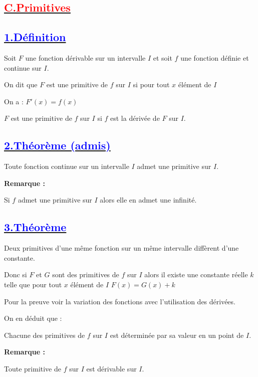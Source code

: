 \documentclass{article}
\begin{document}
\subsection*{\underline{\textbf{\textcolor{red}{C.Primitives}}}}
\subsection*{\underline{\textbf{\textcolor{blue}{1.Définition}}}}
Soit \( F \) une fonction dérivable sur un intervalle \( I \) et soit \( f \) une fonction définie et continue sur \( I \).
 
On dit que \( F \) est une primitive de \( f \) sur \( I \) si pour tout \( x \) élément de \( I \)

On a : \( F'(x)=f(x) \)

\( F \) est une primitive de \( f \) sur \( I \) si \( f \) est la dérivée de \( F \) sur \( I \).

\subsection*{\underline{\textbf{\textcolor{blue}{2.Théorème (admis)}}}}

Toute fonction continue sur un intervalle \( I \) admet une primitive sur \( I \).

\textbf{Remarque : }

Si \( f \) admet une primitive sur \( I \) alors elle en admet une infinité.

\subsection*{\underline{\textbf{\textcolor{blue}{3.Théorème }}}}

Deux primitives d'une même fonction sur un même intervalle diffèrent d'une constante.
 
Donc si \( F \) et \( G \) sont des primitives de \( f \) sur \( I \) alors il existe une constante réelle \( k \) telle que pour tout \( x \) élément de \( I \) \( F(x)=G(x)+k \)
 
Pour la preuve voir la variation des fonctions avec l'utilisation des dérivées.
 
On en déduit que : 
 
Chacune des primitives de \( f \) sur \( I \) est déterminée par sa valeur en un point de \( I \).

\textbf{Remarque :  }

Toute primitive de \( f \) sur \( I \) est dérivable sur \( I \).
 
\end{document}
